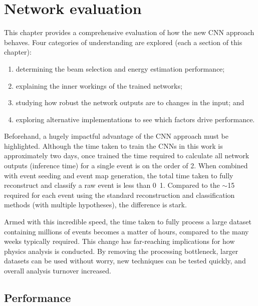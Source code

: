 \chapter{Network evaluation} %
\label{chap:results} %

This chapter provides a comprehensive evaluation of how the new CNN approach behaves. Four
categories of understanding are explored (each a section of this chapter):
\begin{enumerate}
    \item determining the beam selection and energy estimation performance;
    \item explaining the inner workings of the trained networks;
    \item studying how robust the network outputs are to changes in the input; and
    \item exploring alternative implementations to see which factors drive performance.
\end{enumerate}

Beforehand, a hugely impactful advantage of the CNN approach must be highlighted. Although the
time taken to train the CNNs in this work is approximately two days, once trained the time
required to calculate all network outputs (inference time) for a single event is on the order of
\unit{2}{}. When combined with event seeding and event map generation, the total time
taken to fully reconstruct and classify a raw event is less than \unit{0.1}{}.
Compared to the $\sim$\unit{15}{} required for each event using the standard
reconstruction and classification methods (with multiple hypotheses), the difference is stark.

Armed with this incredible speed, the time taken to fully process a large dataset containing
millions of events becomes a matter of hours, compared to the many weeks typically required. This
change has far-reaching implications for how physics analysis is conducted. By removing the
processing bottleneck, larger datasets can be used without worry, new techniques can be tested
quickly, and overall analysis turnover increased.

\section{Performance} %
\label{sec:results_eval} %


